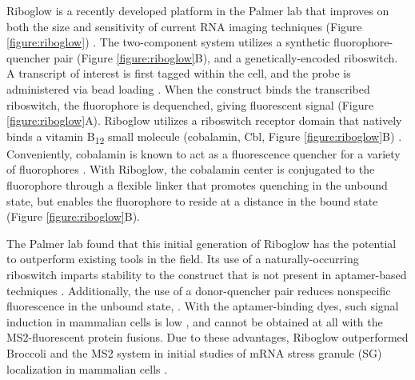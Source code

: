 Riboglow is a recently developed platform in the Palmer lab that improves on both the size and sensitivity of current RNA imaging techniques (Figure \ref{figure:riboglow}) \cite{Braselmannmulticolorriboswitchbasedplatform2018}. The two-component system utilizes a synthetic fluorophore-quencher pair (Figure \ref{figure:riboglow}B), and a genetically-encoded riboswitch. A transcript of interest is first tagged within the cell, and the probe is administered via bead loading \cite{McNeilGlassbeadsload1987,Hayashi-TakanakaTrackingepigenetichistone2011,MorisakiRealtimequantificationsingle2016}.
When the construct binds the transcribed riboswitch, the fluorophore is dequenched, giving fluorescent signal (Figure \ref{figure:riboglow}A). Riboglow utilizes a riboswitch receptor domain that natively binds a vitamin B\textsubscript{12} small molecule (cobalamin, Cbl, Figure \ref{figure:riboglow}B) \cite{JohnsonJrB12cofactorsdirectly2012}.
Conveniently, cobalamin is known to act as a fluorescence quencher for a variety of fluorophores \cite{RosendahlSynthesisbiologicalactivity1982a,LeeDesignSynthesisCharacterization2009,SmeltzerSynthesisCharacterizationFluorescent2001}.
With Riboglow, the cobalamin center is conjugated to the fluorophore through a flexible linker that promotes quenching in the unbound state, but enables the fluorophore to reside at a distance in the bound state (Figure \ref{figure:riboglow}B).

The Palmer lab found that this initial generation of Riboglow has the potential to outperform existing tools in the field.
Its use of a naturally-occurring riboswitch imparts stability to the construct that is not present in aptamer-based techniques \cite{PorterRecurrentRNAmotifs2017}.
Additionally, the use of a donor-quencher pair reduces nonspecific fluorescence in the unbound state, . With the aptamer-binding dyes, such signal induction in mammalian cells is low , and cannot be obtained at all with the MS2-fluorescent protein fusions.  Due to these advantages, Riboglow outperformed Broccoli and the MS2 system in initial studies of mRNA stress granule (SG) localization in mammalian cells \cite{Braselmannmulticolorriboswitchbasedplatform2018}.

